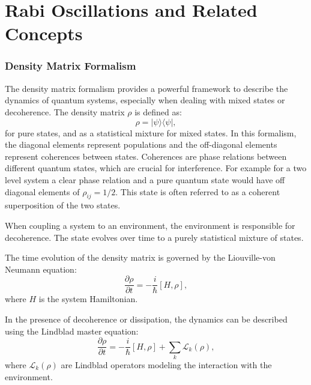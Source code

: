 
\chapter{Rabi Oscillations and Related Concepts} %

\label{ChapterRabiOscillations} %


\subsection{Density Matrix Formalism}

The density matrix formalism provides a powerful framework to describe the dynamics of quantum systems, especially when dealing with mixed states or decoherence.
The density matrix \(\rho\) is defined as:
\begin{equation}
	\rho = |\psi\rangle \langle \psi|,
	\label{eq:DensityMatrix}
\end{equation}
for pure states, and as a statistical mixture for mixed states.
In this formalism, the diagonal elements represent populations and the off-diagonal elements represent coherences between states.
Coherences are phase relations between different quantum states, which are crucial for interference.
For example for a two level system a clear phase relation and a pure quantum state would have off diagonal elements of $ \rho_{ij} = 1/2$.
This state is often referred to as a coherent superposition of the two states.

When coupling a system to an environment, the environment is responsible for decoherence.
The state evolves over time to a purely statistical mixture of states.


The time evolution of the density matrix is governed by the Liouville-von Neumann equation:
\begin{equation}
	\frac{\partial \rho}{\partial t} = -\frac{i}{\hbar} [H, \rho],
	\label{eq:Liouville}
\end{equation}
where \(H\) is the system Hamiltonian.

In the presence of decoherence or dissipation, the dynamics can be described using the Lindblad master equation:
\begin{equation}
	\frac{\partial \rho}{\partial t} = -\frac{i}{\hbar} [H, \rho] + \sum_k \mathcal{L}_k(\rho),
	\label{eq:Lindblad}
\end{equation}
where \(\mathcal{L}_k(\rho)\) are Lindblad operators modeling the interaction with the environment.


